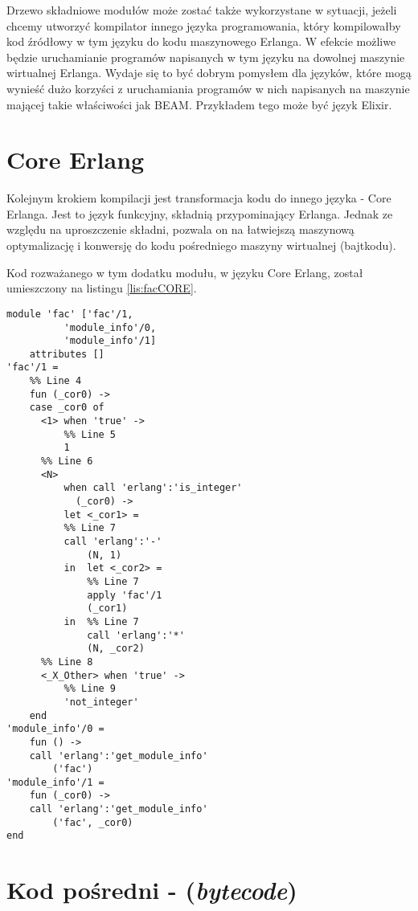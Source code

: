 Drzewo składniowe modułów może zostać także wykorzystane w sytuacji, jeżeli chcemy utworzyć kompilator innego języka programowania, który kompilowałby kod źródłowy w tym języku do kodu maszynowego Erlanga. W efekcie możliwe będzie uruchamianie programów napisanych w tym języku na dowolnej maszynie wirtualnej Erlanga. Wydaje się to być dobrym pomysłem dla języków, które mogą wynieść dużo korzyści z uruchamiania programów w nich napisanych na maszynie mającej takie właściwości jak BEAM. Przykładem tego może być język Elixir.
\section{Core Erlang}
\label{sec:compilationCore}

Kolejnym krokiem kompilacji jest transformacja kodu do innego języka - Core Erlanga. Jest to język funkcyjny, składnią przypominający Erlanga. Jednak ze względu na uproszczenie składni, pozwala on na łatwiejszą maszynową optymalizację i konwersję do kodu pośredniego maszyny wirtualnej (bajtkodu).

Kod rozważanego w tym dodatku modułu, w języku Core Erlang, został umieszczony na listingu \ref{lis:facCORE}.

\begin{lstlisting}[style=erlang, caption=Moduł \texttt{fac} w Core Erlang, label=lis:facCORE]
module 'fac' ['fac'/1,
	      'module_info'/0,
	      'module_info'/1]
    attributes []
'fac'/1 =
    %% Line 4
    fun (_cor0) ->
	case _cor0 of
	  <1> when 'true' ->
	      %% Line 5
	      1
	  %% Line 6
	  <N>
	      when call 'erlang':'is_integer'
		    (_cor0) ->
	      let <_cor1> =
		  %% Line 7
		  call 'erlang':'-'
		      (N, 1)
	      in  let <_cor2> =
		      %% Line 7
		      apply 'fac'/1
			  (_cor1)
		  in  %% Line 7
		      call 'erlang':'*'
			  (N, _cor2)
	  %% Line 8
	  <_X_Other> when 'true' ->
	      %% Line 9
	      'not_integer'
	end
'module_info'/0 =
    fun () ->
	call 'erlang':'get_module_info'
	    ('fac')
'module_info'/1 =
    fun (_cor0) ->
	call 'erlang':'get_module_info'
	    ('fac', _cor0)
end
\end{lstlisting}

\section{Kod pośredni -  (\emph{bytecode})}


